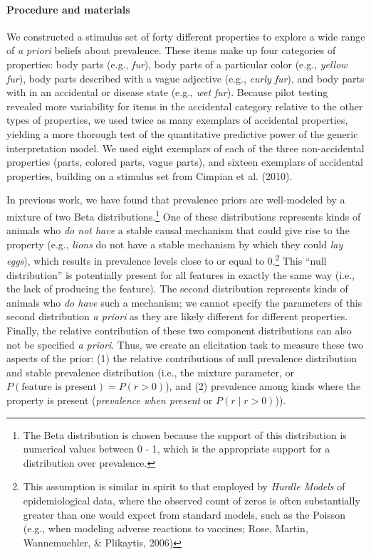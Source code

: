 \documentclass[floatsintext,doc]{apa6}
\theoremstyle{definition}
\theoremstyle{definition}
\theoremstyle{definition}
\theoremstyle{remark}
\begin{document}
\paragraph{Procedure and materials}\label{procedure-and-materials}

We constructed a stimulus set of forty different properties to explore a
wide range of \emph{a priori} beliefs about prevalence. These items make
up four categories of properties: body parts (e.g., \emph{fur}), body
parts of a particular color (e.g., \emph{yellow fur}), body parts
described with a vague adjective (e.g., \emph{curly fur}), and body
parts with in an accidental or disease state (e.g., \emph{wet fur}).
Because pilot testing revealed more variability for items in the
accidental category relative to the other types of properties, we used
twice as many exemplars of accidental properties, yielding a more
thorough test of the quantitative predictive power of the generic
interpretation model. We used eight exemplars of each of the three
non-accidental properties (parts, colored parts, vague parts), and
sixteen exemplars of accidental properties, building on a stimulus set
from Cimpian et al. (2010).

In previous work, we have found that prevalence priors are well-modeled
by a mixture of two Beta distributions.\footnote{The Beta distribution
  is chosen because the support of this distribution is numerical values
  between 0 - 1, which is the appropriate support for a distribution
  over prevalence.} One of these distributions represents kinds of
animals who \emph{do not have} a stable causal mechanism that could give
rise to the property (e.g., \emph{lions} do not have a stable mechanism
by which they could \emph{lay eggs}), which results in prevalence levels
close to or equal to 0.\footnote{This assumption is similar in spirit to
  that employed by \emph{Hurdle Models} of epidemiological data, where
  the observed count of zeros is often substantially greater than one
  would expect from standard models, such as the Poisson (e.g., when
  modeling adverse reactions to vaccines; Rose, Martin, Wannemuehler, \&
  Plikaytis, 2006)} This \enquote{null distribution} is potentially
present for all features in exactly the same way (i.e., the lack of
producing the feature). The second distribution represents kinds of
animals who \emph{do have} such a mechanism; we cannot specify the
parameters of this second distribution \emph{a priori} as they are
likely different for different properties. Finally, the relative
contribution of these two component distributions can also not be
specified \emph{a priori}. Thus, we create an elicitation task to
measure these two aspects of the prior: (1) the relative contributions
of null prevalence distribution and stable prevalence distribution
(i.e., the mixture parameter, or
\(P(\text{feature is present}) = P(r > 0)\)), and (2) prevalence among
kinds where the property is present (\emph{prevalence when present} or
\(P(r \mid r > 0)\))).
\end{document}
